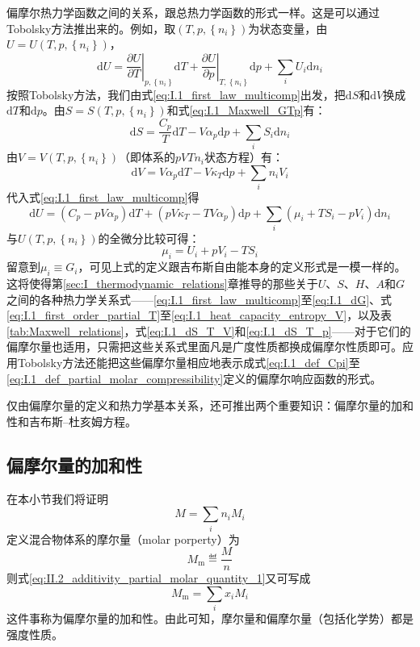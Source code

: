 \documentclass[main.tex]{subfiles}
\begin{document}
偏摩尔热力学函数之间的关系，跟总热力学函数的形式一样。这是可以通过Tobolsky方法推出来的。例如，取$\left(T,p,\left\{n_i\right\}\right)$为状态变量，由$U=U\left(T,p,\left\{n_i\right\}\right)$，
\[\mathrm{d}U=\left.\frac{\partial U}{\partial T}\right|_{p,\left\{n_i\right\}}\mathrm{d}T+\left.\frac{\partial U}{\partial p}\right|_{T,\left\{n_i\right\}}\mathrm{d}p+\sum_i U_i\mathrm{d}n_i\]
按照Tobolsky方法，我们由式\eqref{eq:I.1_first_law_multicomp}出发，把$\mathrm{d}S$和$\mathrm{d}V$换成$\mathrm{d}T$和$\mathrm{d}p$。由$S=S\left(T,p,\left\{n_i\right\}\right)$和式\eqref{eq:I.1_Maxwell_GTp}有：
\[\mathrm{d}S=\frac{C_p}{T}\mathrm{d}T-V\alpha_p\mathrm{d}p+\sum_iS_i\mathrm{d}n_i\]
由$V=V\left(T,p,\left\{n_i\right\}\right)$（即体系的$pVTn_i$状态方程）有：
\[\mathrm{d}V=V\alpha_p\mathrm{d}T-V\kappa_T\mathrm{d}p+\sum_in_iV_i\]
代入式\eqref{eq:I.1_first_law_multicomp}得
\[\mathrm{d}U=\left(C_p-pV\alpha_p\right)\mathrm{d}T+\left(pV\kappa_T-TV\alpha_p\right)\mathrm{d}p+\sum_i\left(\mu_i+TS_i-pV_i\right)\mathrm{d}n_i\]
与$U\left(T,p,\left\{n_i\right\}\right)$的全微分比较可得：
\begin{equation}\label{eq:II.2_partial_molar_thermodynamic_functions_relation}
    \mu_i=U_i+pV_i-TS_i
\end{equation}
留意到$\mu_i\equiv G_i$，可见上式的定义跟吉布斯自由能本身的定义形式是一模一样的。这将使得第\ref{sec:I_thermodynamic_relations}章推导的那些关于$U$、$S$、$H$、$A$和$G$之间的各种热力学关系式——\eqref{eq:I.1_first_law_multicomp}至\eqref{eq:I.1_dG}、式\eqref{eq:I.1_first_order_partial_T}至\eqref{eq:I.1_heat_capacity_entropy_V}，以及表\ref{tab:Maxwell_relations}，式\eqref{eq:I.1_dS_T_V}和\eqref{eq:I.1_dS_T_p}——对于它们的偏摩尔量也适用，只需把这些关系式里面凡是广度性质都换成偏摩尔性质即可。应用Tobolsky方法还能把这些偏摩尔量相应地表示成式\eqref{eq:I.1_def_Cpi}至\eqref{eq:I.1_def_partial_molar_compressibility}定义的偏摩尔响应函数的形式。

仅由偏摩尔量的定义和热力学基本关系，还可推出两个重要知识：偏摩尔量的加和性和吉布斯--杜亥姆方程。

\subsection{偏摩尔量的加和性}
在本小节我们将证明
\begin{equation}\label{eq:II.2_additivity_partial_molar_quantity_1}
    M=\sum_in_iM_i
\end{equation}
定义混合物体系的摩尔量（molar porperty）为
\[M_\text{m}\eqdef \frac{M}{n}\]
则式\eqref{eq:II.2_additivity_partial_molar_quantity_1}又可写成
\begin{equation}\label{eq:II.2_additivity_partial_molar_quantity_2}
    M_\text{m}=\sum_ix_iM_i
\end{equation}
这件事称为偏摩尔量的加和性。由此可知，摩尔量和偏摩尔量（包括化学势）都是强度性质。
\end{document}
